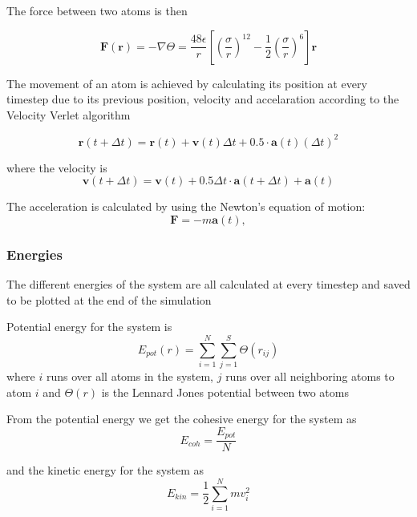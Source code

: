 \documentclass[12pt,a4paper]{article}
\begin{document}
The force between two atoms is then

\begin{equation}
\mathbf F(\mathbf r) = - \nabla \Theta = \frac{48\epsilon}{r} \left[\left(\frac{\sigma}{r}\right)^{12} - \frac 1 2 \left(\frac{\sigma}{r}\right)^6\right] \mathbf r
\end{equation}

The movement of an atom is achieved by calculating its position at every timestep due to its previous position, velocity and accelaration according to the Velocity Verlet algorithm

\begin{equation}
\label{eq:newPos}
\mathbf r(t+\Delta t) =\mathbf r(t) + \mathbf v(t)\Delta t + 0.5 \cdot \mathbf a(t) (\Delta t)^2
\end{equation}

where the velocity is 
\begin{equation}
\label{eq:velVerlet}
\mathbf v(t+\Delta t) = \mathbf v(t) + 0.5\Delta t  \cdot \mathbf a(t+\Delta t) + \mathbf a(t)
\end{equation}

The acceleration is calculated by using the Newton's equation of motion:
\begin{equation}
\label{eq:acceleration}
\mathbf F = -m\mathbf a(t),
\end{equation}


\subsubsection{Energies}
The different energies of the system are all calculated at every timestep and saved to be plotted at the end of the simulation

Potential energy for the system is 
\begin{equation}
E_{pot}(r)=\sum_{i=1}^N \sum_{j=1}^S \Theta(r_{ij})
\end{equation}
where \(i\) runs over all atoms in the system, \(j\) runs over all neighboring atoms to atom \(i\) and \( \Theta(r)\) is the Lennard Jones potential between two atoms 

From the potential energy we get the cohesive energy for the system as
\begin{equation}
\label{eq:Ecoh}
E_{coh}=\frac{E_{pot}} N
\end{equation}

and the kinetic energy for the system as
\begin{equation}
\label{eq:Ekin}
E_{kin}=\frac{1}2 \sum_{i=1}^N mv_i^2
\end{equation}
\end{document}

